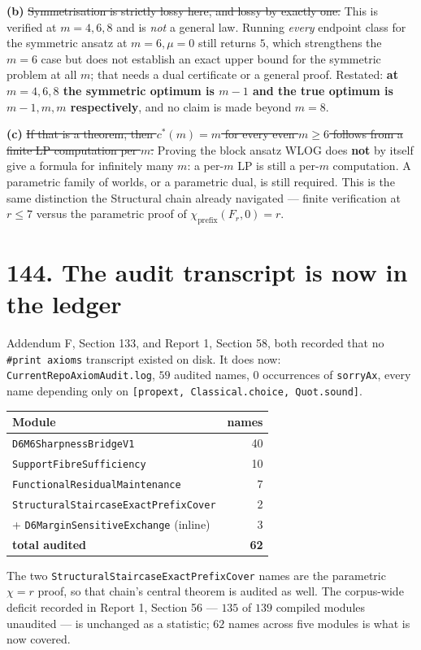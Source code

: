 \documentclass[9pt,twocolumn]{article}
\newcommand{\oldclaim}[1]{\sout{#1}}
\renewcommand{\_}{\CIGunderscore\allowbreak}
\begin{document}
\textbf{(b)} \oldclaim{Symmetrisation is strictly lossy here, and lossy by exactly one.} This is verified at $m=4,6,8$ and is \emph{not} a general law. Running \emph{every} endpoint class for the symmetric ansatz at $m=6,\mu=0$ still returns $5$, which strengthens the $m=6$ case but does not establish an exact upper bound for the symmetric problem at all $m$; that needs a dual certificate or a general proof. Restated: \textbf{at $m=4,6,8$ the symmetric optimum is $m-1$ and the true optimum is $m-1,m,m$ respectively}, and no claim is made beyond $m=8$.

\textbf{(c)} \oldclaim{If that is a theorem, then $c^\ast(m)=m$ for every even $m\ge6$ follows from a finite LP computation per $m$.} Proving the block ansatz WLOG does \textbf{not} by itself give a formula for infinitely many $m$: a per-$m$ LP is still a per-$m$ computation. A parametric family of worlds, or a parametric dual, is still required. This is the same distinction the Structural chain already navigated --- finite verification at $r\le7$ versus the parametric proof of $\chi_{\text{prefix}}(F_r,0)=r$.

\section*{144. The audit transcript is now in the ledger}
Addendum F, Section 133, and Report 1, Section 58, both recorded that no \texttt{\#print axioms} transcript existed on disk. It does now: \texttt{CurrentRepoAxiomAudit.log}, $59$ audited names, $0$ occurrences of \texttt{sorryAx}, every name depending only on \texttt{[propext, Classical.choice, Quot.sound]}.
\begin{center}\scriptsize
\begin{tabularx}{0.98\columnwidth}{X r}
\toprule
Module & names\\
\midrule
\texttt{D6M6\allowbreak SharpnessBridgeV1} & 40\\
\texttt{Support\allowbreak FibreSufficiency} & 10\\
\texttt{Functional\allowbreak ResidualMaintenance} & 7\\
\texttt{Structural\allowbreak Staircase\allowbreak ExactPrefixCover} & 2\\
\midrule
+ \texttt{D6\allowbreak Margin\allowbreak SensitiveExchange} (inline) & 3\\
\midrule
\textbf{total audited} & \textbf{62}\\
\bottomrule
\end{tabularx}
\end{center}
The two \texttt{StructuralStaircaseExactPrefixCover} names are the parametric $\chi=r$ proof, so that chain's central theorem is audited as well. The corpus-wide deficit recorded in Report 1, Section 56 --- $135$ of $139$ compiled modules unaudited --- is unchanged as a statistic; $62$ names across five modules is what is now covered.
\end{document}
